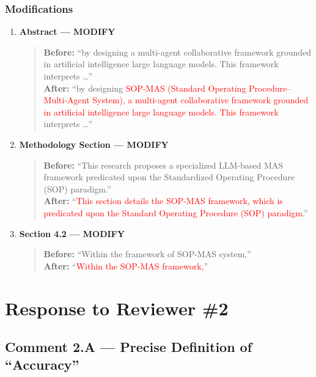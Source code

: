 \documentclass[11pt,a4paper]{article}
\begin{document}
\subsubsection{Modifications}
\begin{enumerate}
\item \textbf{Abstract --- MODIFY}
\begin{quote}
\textbf{Before:} ``by designing a multi-agent collaborative framework grounded in artificial intelligence large language models. This framework interprets \ldots''\\[4pt]
\textbf{After:} ``by designing \textcolor{red}{SOP-MAS (Standard Operating Procedure--Multi-Agent System), a multi-agent collaborative framework grounded in artificial intelligence large language models. This framework} interprets \ldots''
\end{quote}

\item \textbf{Methodology Section --- MODIFY}
\begin{quote}
\textbf{Before:} ``This research proposes a specialized LLM-based MAS framework predicated upon the Standardized Operating Procedure (SOP) paradigm.''\\[4pt]
\textbf{After:} ``\textcolor{red}{This section details the SOP-MAS framework, which is predicated upon the Standard Operating Procedure (SOP) paradigm.}''
\end{quote}

\item \textbf{Section 4.2 --- MODIFY}
\begin{quote}
\textbf{Before:} ``Within the framework of SOP-MAS system,''\\[4pt]
\textbf{After:} ``\textcolor{red}{Within the SOP-MAS framework,}''
\end{quote}
\end{enumerate}


\newpage
\section{Response to Reviewer \#2}

\subsection{Comment 2.A --- Precise Definition of ``Accuracy''}
\end{document}
